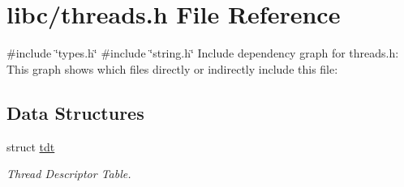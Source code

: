 \hypertarget{a00044}{}\section{libc/threads.h File Reference}
\label{a00044}
{\ttfamily \#include \char`\"{}types.\+h\char`\"{}}\newline
{\ttfamily \#include \char`\"{}string.\+h\char`\"{}}\newline
Include dependency graph for threads.\+h\+:
This graph shows which files directly or indirectly include this file\+:
\subsection*{Data Structures}
\begin{DoxyCompactItemize}
\item 
struct \hyperlink{a00076}{tdt}
\begin{DoxyCompactList}\small\item\em Thread Descriptor Table. \end{DoxyCompactList}\end{DoxyCompactItemize}
